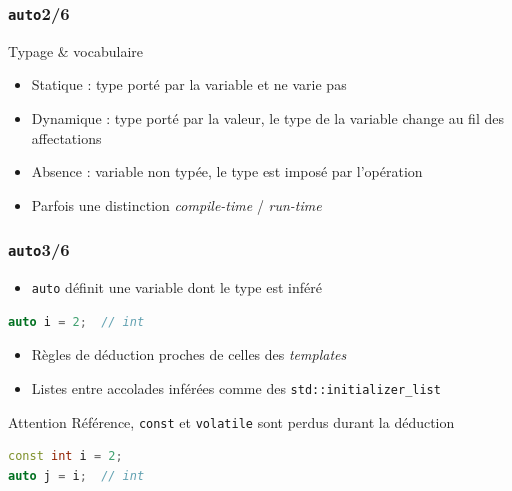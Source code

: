 \documentclass[C++.tex]{subfiles}
\begin{document}
\begin{frame}[fragile]
	\frametitle{\lstinline|auto|\titlehfill{}2/6}
	\begin{block}{Typage \& vocabulaire}
		\begin{itemize}
			\item Statique : type porté par la variable et ne varie pas
			\item Dynamique : type porté par la valeur, le type de la variable change au fil des affectations
			\item Absence : variable non typée, le type est imposé par l'opération
			\item Parfois une distinction \textit{compile-time} / \textit{run-time}

		\end{itemize}
	\end{block}
\end{frame}

\begin{frame}[fragile]
	\frametitle{\lstinline|auto|\titlehfill{}3/6}
	\begin{itemize}
		\item \lstinline|auto| définit une variable dont le type est inféré
	\end{itemize}

	\begin{lstlisting}[language=C++]
auto i = 2;  // int\end{lstlisting}

	\begin{itemize}
		\item Règles de déduction proches de celles des \textit{templates}
		\item Listes entre accolades inférées comme des \lstinline|std::initializer_list|
	\end{itemize}

	\begin{alertblock}{Attention}
		Référence, \lstinline|const| et \lstinline|volatile| sont perdus durant la déduction

		\begin{lstlisting}[language=C++]
const int i = 2;
auto j = i;  // int \end{lstlisting}
	\end{alertblock}
\end{frame}
\end{document}

